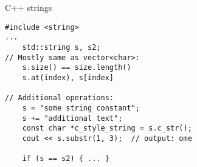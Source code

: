 \begin{frame}[fragile,label=cppStr]{C++ strings}
    \lstset{
        language=C++,
        style=smaller
    }
\begin{lstlisting}
#include <string>
...
    std::string s, s2;
// Mostly same as vector<char>:
    s.size() == size.length()
    s.at(index), s[index]

// Additional operations:
    s = "some string constant";
    s += "additional text";
    const char *c_style_string = s.c_str();
    cout << s.substr(1, 3);  // output: ome

    if (s == s2) { ... }
\end{lstlisting}
\end{frame}

